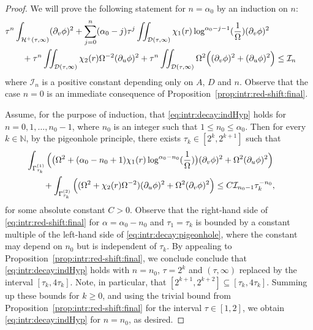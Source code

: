 \documentclass[12 pt, reqno]{amsart}
\theoremstyle{definition}
\theoremstyle{remark}
\numberwithin{equation}{section}
\newcommand{\rd}{\partial}
\newcommand{\bb}{\Big}
\newcommand{\0}{\emptyset}
\newcommand{\alp}{\alpha}
\newcommand{\Gmm}{\Gamma}
\newcommand{\Omg}{\Omega}
\newcommand{\bbN}{\mathbb N}
\newcommand{\calD}{\mathcal D}
\newcommand{\calH}{\mathcal H}
\newcommand{\calI}{\mathcal I}
\newcommand{\EH}{\calH^{+}}
\begin{document}
\begin{proof} 
We will prove the following statement for $n = \alp_{0}$ by an induction on $n$:
\begin{equation} \label{eq:intr:decay:indHyp}
\begin{aligned}
& \hskip-2em
	\tau^{n} \int_{\EH(\tau, \infty)} (\rd_{v} \phi)^{2} 
	+ \sum_{j=0}^{n} (\alp_{0} - j) \tau^{j} \iint_{\calD(\tau, \infty)} \chi_{1}(r) \log^{\alp_{0}-j-1} (\frac{1}{\Omg}) (\rd_{v} \phi)^{2} \\
	& + \tau^{n} \iint_{\calD(\tau, \infty)} \chi_{2}(r) \Omg^{-2} (\rd_{u} \phi)^{2} 
	+ \tau^{n} \iint_{\calD(\tau, \infty)} \Omg^{2} \bb( (\rd_{v} \phi)^{2} + (\rd_{u} \phi)^{2} \bb)
	\leq \calI_{n}
\end{aligned}
\end{equation}
where $\calI_{n}$ is a positive constant depending only on $A$, $D$ and $n$. Observe that the case $n = 0$ is an immediate consequence of Proposition~\ref{prop:intr:red-shift:final}. 

Assume, for the purpose of induction, that \eqref{eq:intr:decay:indHyp} holds for $n = 0, 1, \ldots, n_{0}-1$, where $n_{0}$ is an integer such that $1 \leq n_{0} \leq \alp_{0}$. Then for every $k \in \bbN$, by the pigeonhole principle, there exists $\tau_{k} \in [2^{k}, 2^{k+1}]$ such that
\begin{equation} \label{eq:intr:decay:pigeonhole}
\begin{aligned}
& \hskip-2em
	\int_{\Gmm^{(1)}_{\tau_{k}}} \bb( \big( \Omg^{2} + (\alp_{0} - n_{0} + 1) \chi_{1}(r) \log^{\alp_{0} - n_{0}} (\frac{1}{\Omg}) \big) (\rd_{v} \phi)^{2} 
	+ \Omg^{2} (\rd_{u} \phi)^{2} \bb) \\
	& + \int_{\Gmm^{(2)}_{\tau_{k}}} \bb( (\Omg^{2} + \chi_{2}(r) \Omg^{-2}) (\rd_{u} \phi)^{2} + \Omg^{2} (\rd_{v} \phi)^{2} \bb)
	\leq C \calI_{n_{0}-1} \tau_{k}^{-n_{0}},
\end{aligned}
\end{equation}
for some absolute constant $C > 0$. Observe that the right-hand side of \eqref{eq:intr:red-shift:final} for $\alp = \alp_{0} - n_{0}$ and $\tau_{1} = \tau_{k}$ is bounded by a constant multiple of the left-hand side of \eqref{eq:intr:decay:pigeonhole}, where the constant may depend on $n_{0}$ but is independent of $\tau_{k}$.
By appealing to Proposition~\ref{prop:intr:red-shift:final}, we conclude conclude that \eqref{eq:intr:decay:indHyp} holds with $n = n_{0}$, $\tau = 2^{k}$ and $(\tau, \infty)$ replaced by the interval $[\tau_{k}, 4 \tau_{k}]$. Note, in particular, that $[2^{k+1}, 2^{k+2}] \subseteq [\tau_{k}, 4 \tau_{k}]$. Summing up these bounds for $k \geq 0$, and using the trivial bound from Proposition~\ref{prop:intr:red-shift:final} for the interval $\tau \in [1, 2]$, we obtain \eqref{eq:intr:decay:indHyp} for $n = n_{0}$, as desired. \qedhere
\end{proof}
\end{document}
